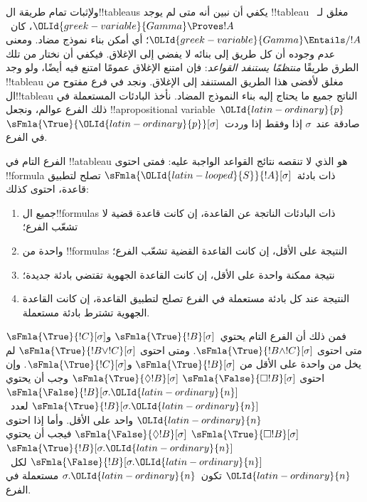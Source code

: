 \documentclass[../../../include/open-logic-section]{subfiles}
\begin{document}


\begin{explain}
  ولإثبات تمام طريقة ال!!{tableau}s يكفي أن نبين أنه متى لم يوجد
  !!{tableau} مغلق لـ~${\OLId{greek-variable}{Gamma}} \Proves !A$، كان~${\OLId{greek-variable}{Gamma}} \Entails/ !A$؛
  أي أمكن بناء نموذج مضاد. ومعنى عدم وجوده أن كل طريق إلى بنائه لا يفضي
  إلى الإغلاق. فيكفي أن نختار من تلك الطرق طريقًا
  \emph{منتظمًا يستنفد القواعد}: فإن امتنع الإغلاق عمومًا امتنع فيه
  أيضًا، ولو وجد !!{tableau} مغلق لأفضى هذا الطريق المستنفد إلى
  الإغلاق. ونجد في فرع مفتوح من ال!!{tableau} الناتج جميع ما يحتاج إليه
  بناء النموذج المضاد. نأخذ البادئات المستعملة في ذلك الفرع عوالم،
  ونجعل !!a{propositional variable}~${\OLId{latin-ordinary}{p}}$ صادقة عند~$\sigma$ إذا وفقط إذا
  وردت~$\sFmla{\True}{{\OLId{latin-ordinary}{p}}}[\sigma]$ في الفرع.
\end{explain}

\begin{defn}
  الفرع التام في !!a{tableau} هو الذي لا تنقصه نتائج القواعد الواجبة
  عليه: فمتى احتوى !!{formula} ذات بادئة~$\sFmla{{\OLId{latin-looped}{S}}}{!A}[\sigma]$
  تصلح لتطبيق قاعدة، احتوى كذلك:
  \begin{enumerate}
    \item جميع ال!!{formula}s ذات البادئات الناتجة عن القاعدة، إن
      كانت قاعدة قضية لا تشعّب الفرع؛
    \item واحدة من !!{formula}s النتيجة على الأقل، إن كانت القاعدة
      القضية تشعّب الفرع؛
    \item نتيجة ممكنة واحدة على الأقل، إن كانت القاعدة الجهوية
      تقتضي بادئة جديدة؛
    \item النتيجة عند كل بادئة مستعملة في الفرع تصلح لتطبيق القاعدة،
      إن كانت القاعدة الجهوية تشترط بادئة مستعملة.
  \end{enumerate}
\end{defn}

\begin{explain}
فمن ذلك أن الفرع التام يحتوي~$\sFmla{\True}{!B}[\sigma]$
و$\sFmla{\True}{!C}[\sigma]$ متى احتوى
$\sFmla{\True}{!B \land !C}[\sigma]$. ومتى احتوى
$\sFmla{\True}{!B \lor !C}[\sigma]$ لم يخل من واحدة على الأقل من
$\sFmla{\True}{!B}[\sigma]$ و$\sFmla{\True}{!C}[\sigma]$.
وإن احتوى
 {$\sFmla{\False}{\Box !B}[\sigma]$}
{$\sFmla{\True}{\Diamond !B}[\sigma]$} وجب أن يحتوي
 {$\sFmla{\False}{!B}[\sigma.{\OLId{latin-ordinary}{n}}]$}
{$\sFmla{\True}{!B}[\sigma.{\OLId{latin-ordinary}{n}}]$} لعدد~${\OLId{latin-ordinary}{n}}$ واحد على الأقل.
وأما إذا احتوى
 {$\sFmla{\True}{\Box !B}[\sigma]$}
{$\sFmla{\False}{\Diamond !B}[\sigma]$} فيجب أن يحتوي
 {$\sFmla{\True}{!B}[\sigma.{\OLId{latin-ordinary}{n}}]$}
{$\sFmla{\False}{!B}[\sigma.{\OLId{latin-ordinary}{n}}]$} لكل~${\OLId{latin-ordinary}{n}}$ تكون~$\sigma.{\OLId{latin-ordinary}{n}}$
مستعملة في الفرع.
\end{explain}
\end{document}
